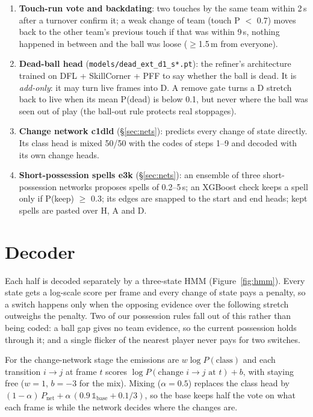 \documentclass[10pt,a4paper]{article}
\newcommand{\code}[1]{\texttt{\small #1}}
\begin{document}
\begin{enumerate}[label=\textbf{\arabic*}]
        the learned probabilities.
  \item \textbf{Touch-run vote and backdating}: two touches by the same team within 2\,s after a turnover
        confirm it; a weak change of team (touch P $<$ 0.7) moves back to the other team's previous
        touch if that was within 9\,s, nothing happened in between and the ball was loose
        ($\geq$1.5\,m from everyone).
  \item \textbf{Dead-ball head} (\code{models/dead\_ext\_d1\_s*.pt}): the refiner's architecture trained
        on DFL + SkillCorner + PFF to say whether the ball is dead. It is \emph{add-only}: it may turn
        live frames into D. A remove gate turns a D stretch back to live when its mean P(dead) is below
        0.1, but never where the ball was seen out of play (the ball-out rule protects real stoppages).
  \item \textbf{Change network c1dld} (\S\ref{sec:nets}): predicts every change of state directly. Its
        class head is mixed 50/50 with the codes of steps 1--9 and decoded with its own change heads.
  \item \textbf{Short-possession spells e3k} (\S\ref{sec:nets}): an ensemble of three short-possession
        networks proposes spells of 0.2--5\,s; an XGBoost check keeps a spell only if P(keep) $\geq$ 0.3;
        its edges are snapped to the start and end heads; kept spells are pasted over H, A and D.
\end{enumerate}

\section{Decoder}\label{sec:decoder}

Each half is decoded separately by a three-state HMM (Figure~\ref{fig:hmm}). Every state gets a
log-scale score per frame and every change of state pays a penalty, so a switch happens only when
the opposing evidence over the following stretch outweighs the penalty. Two of our possession rules
fall out of this rather than being coded: a ball gap gives no team evidence, so the current
possession holds through it; and a single flicker of the nearest player never pays for two switches.

For the change-network stage the emissions are $w\log P(\text{class})$ and each transition
$i\to j$ at frame $t$ scores $\log P(\text{change } i\to j \text{ at } t) + b$, with staying free
($w=1$, $b=-3$ for the mix). Mixing ($\alpha=0.5$) replaces the class head by
$(1-\alpha)\,P_{\text{net}} + \alpha\,(0.9\,\mathbb{1}_{\text{base}} + 0.1/3)$, so the base keeps
half the vote on what each frame is while the network decides where the changes are.
\end{document}
